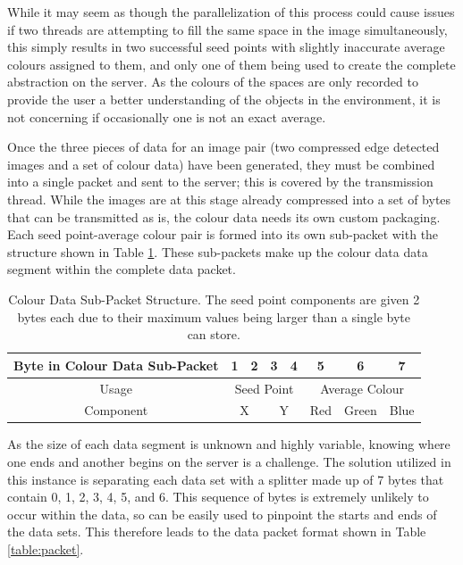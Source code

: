 While it may seem as though the parallelization of this process could cause issues if two threads are attempting to fill the same space in the image simultaneously, this simply results in two successful seed points with slightly inaccurate average colours assigned to them, and only one of them being used to create the complete abstraction on the server. As the colours of the spaces are only recorded to provide the user a better understanding of the objects in the environment, it is not concerning if occasionally one is not an exact average.

Once the three pieces of data for an image pair (two compressed edge detected images and a set of colour data) have been generated, they must be combined into a single packet and sent to the server; this is covered by the transmission thread. While the images are at this stage already compressed into a set of bytes that can be transmitted as is, the colour data needs its own custom packaging. Each seed point-average colour pair is formed into its own sub-packet with the structure shown in Table \ref{table:colour}. These sub-packets make up the colour data data segment within the complete data packet.

\begin{table}[H]
\centering
\caption{Colour Data Sub-Packet Structure. The seed point components are given 2 bytes each due to their maximum values being larger than a single byte can store.}
\label{table:colour}
\begin{tabular}{|c|c|c|c|c|c|c|c|}
\hline
Byte in Colour Data Sub-Packet & 1          & 2         & 3          & 4         & 5         & 6           & 7         \\ \hline
Usage                          & \multicolumn{4}{c|}{Seed Point}                 & \multicolumn{3}{c|}{Average Colour} \\ \hline
Component                      & \multicolumn{2}{c|}{X} & \multicolumn{2}{c|}{Y} & Red       & Green       & Blue      \\ \hline
\end{tabular}
\end{table}

As the size of each data segment is unknown and highly variable, knowing where one ends and another begins on the server is a challenge. The solution utilized in this instance is separating each data set with a splitter made up of 7 bytes that contain 0, 1, 2, 3, 4, 5, and 6. This sequence of bytes is extremely unlikely to occur within the data, so can be easily used to pinpoint the starts and ends of the data sets. This therefore leads to the data packet format shown in Table \ref{table:packet}.

